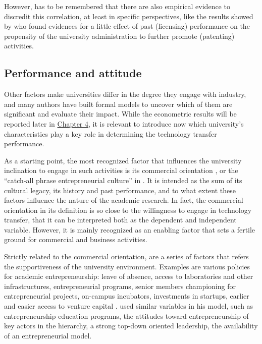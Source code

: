 However, has to be remembered that there are also empirical evidence to discredit this correlation, at least in specific perspectives, like the results showed by \citet{Thursby2002} who found evidences for a little effect of past (licensing) performance on the propensity of the university administration to further promote (patenting) activities.


\subsection{Performance and attitude}

Other factors make universities differ in the degree they engage with industry, and many authors have built formal models to uncover which of them are significant and evaluate their impact. While the econometric results will be reported later in \hyperref[Chapter4]{Chapter 4}, it is relevant to introduce now which university's characteristics play a key role in determining the technology transfer performance.

As a starting point, the most recognized factor that influences the university inclination to engage in such activities is its commercial orientation \citep{DEste2007}, or the \enquote{catch-all phrase entrepreneurial culture} in \citet{OwenSmith2001}. It is intended as the sum of its cultural legacy, its history and past performance, and to what extent these factors influence the nature of the academic research. In fact, the commercial orientation in its definition is so close to the willingness to engage in technology transfer, that it can be interpreted both as the dependent and independent variable. However, it is mainly recognized as an enabling factor that sets a fertile ground for commercial and business activities. 

Strictly related to the commercial orientation, are a series of factors that refers the supportiveness of the university environment. Examples are various policies for academic entrepreneurship: leave of absence, access to laboratories and other infrastructures, entrepreneurial programs, senior members championing for entrepreneurial projects, on-campus incubators, investments in startups, earlier and easier access to venture capital \citep{Baldini2007}. \citet{Guerrero2014} used similar variables in his model, such as entrepreneurship education programs, the attitudes toward entrepreneurship of key actors in the hierarchy, a strong top-down oriented leadership, the availability of an entrepreneurial model.

